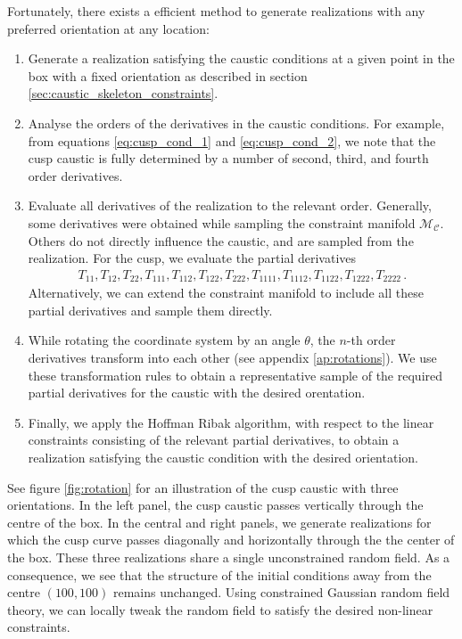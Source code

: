\documentclass[a4paper, 11pt]{article}
\begin{document}
Fortunately, there exists a efficient method to generate realizations with any preferred orientation at any location:
\begin{enumerate}
\item 
Generate a realization satisfying the caustic conditions at a given point in the box with a fixed orientation as described in section \ref{sec:caustic_skeleton_constraints}. 
\item 
Analyse the orders of the derivatives in the caustic conditions. For example, from equations \eqref{eq:cusp_cond_1} and \eqref{eq:cusp_cond_2}, we note that the cusp caustic is fully determined by a number of second, third, and fourth order derivatives.
\item
Evaluate all derivatives of the realization to the relevant order. Generally, some derivatives were obtained while sampling the constraint manifold $\mathcal{M}_\mathcal{C}$. Others do not directly influence the caustic, and are sampled from the realization. For the cusp, we evaluate the partial derivatives 
\begin{align}
T_{11},T_{12},T_{22},T_{111},T_{112},T_{122},T_{222},T_{1111},T_{1112},T_{1122},T_{1222},T_{2222}\,.
\end{align}
Alternatively, we can extend the constraint manifold to include all these partial derivatives and sample them directly.
\item 
While rotating the coordinate system by an angle $\theta$, the $n$-th order derivatives transform into each other (see appendix \ref{ap:rotations}). We use these transformation rules to obtain a representative sample of the required partial derivatives for the caustic with the desired orentation.
\item 
Finally, we apply the Hoffman Ribak algorithm, with respect to the linear constraints consisting of the relevant partial derivatives, to obtain a realization satisfying the caustic condition with the desired orientation.
\end{enumerate}

See figure \ref{fig:rotation} for an illustration of the cusp caustic with three orientations. In the left panel, the cusp caustic passes vertically through the centre of the box. In the central and right panels, we generate realizations for which the cusp curve passes diagonally and horizontally through the the center of the box. These three realizations share a single unconstrained random field. As a consequence, we see that the structure of the initial conditions away from the centre $(100,100)$ remains unchanged. Using constrained Gaussian random field theory, we can locally tweak the random field to satisfy the desired non-linear constraints.
\end{document}
